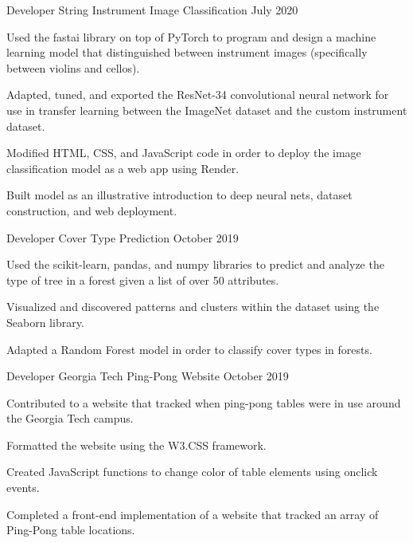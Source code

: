 \begin{cventries}

\cvproject
{Developer} %
{String Instrument Image Classification} %
{} %
{July 2020} %
{ %
\begin{cvitems}
\item Used the fastai library on top of PyTorch to program and design a machine learning model that
distinguished between instrument images (specifically between violins and cellos).
\item Adapted, tuned, and exported the ResNet-34 convolutional neural network for use in transfer learning between the ImageNet dataset and the custom instrument dataset.
\item Modified HTML, CSS, and JavaScript code in order to deploy the image classification model as a web app using Render.
\item Built model as an illustrative introduction to deep neural nets, dataset construction, and web deployment. 
\end{cvitems}
}

\cvproject
{Developer} %
{Cover Type Prediction} %
{} %
{October 2019} %
{ %
\begin{cvitems}
\item Used the scikit-learn, pandas, and numpy libraries to predict and analyze the type of tree in a forest given a list of over 50 attributes.
\item Visualized and discovered patterns and clusters within the dataset using the Seaborn library.
\item Adapted a Random Forest model in order to classify cover types in forests.
\end{cvitems}
}

\cvproject
{Developer} %
{Georgia Tech Ping-Pong Website} %
{} %
{October 2019} %
{ %
\begin{cvitems}
\item Contributed to a website that tracked when ping-pong tables were in use around the Georgia Tech campus.
\item Formatted the website using the W3.CSS framework.
\item Created JavaScript functions to change color of table elements using onclick events.
\item Completed a front-end implementation of a website that tracked an array of Ping-Pong table locations. 
\end{cvitems}
}


\end{cventries}
